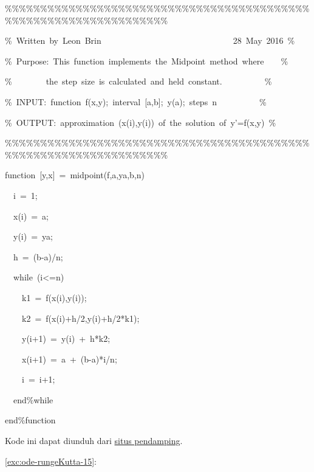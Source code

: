 \begin{lyxcode}
\%\%\%\%\%\%\%\%\%\%\%\%\%\%\%\%\%\%\%\%\%\%\%\%\%\%\%\%\%\%\%\%\%\%\%\%\%\%\%\%\%\%\%\%\%\%\%\%\%\%\%\%\%\%\%\%\%\%\%\%\%\%\%\%\%\%

\%~Written~by~Leon~Brin~~~~~~~~~~~~~~~~~~~~~~~~~~~~~~~28~May~2016~\%

\%~Purpose:~This~function~implements~the~Midpoint~method~where~~~~\%

\%~~~~~~~~the~step~size~is~calculated~and~held~constant.~~~~~~~~~~\%

\%~INPUT:~function~f(x,y);~interval~{[}a,b{]};~y(a);~steps~n~~~~~~~~~~\%

\%~OUTPUT:~approximation~(x(i),y(i))~of~the~solution~of~y'=f(x,y)~\%

\%\%\%\%\%\%\%\%\%\%\%\%\%\%\%\%\%\%\%\%\%\%\%\%\%\%\%\%\%\%\%\%\%\%\%\%\%\%\%\%\%\%\%\%\%\%\%\%\%\%\%\%\%\%\%\%\%\%\%\%\%\%\%\%\%\%

function~{[}y,x{]}~=~midpoint(f,a,ya,b,n)

~~i~=~1;

~~x(i)~=~a;

~~y(i)~=~ya;

~~h~=~(b-a)/n;

~~while~(i<=n)

~~~~k1~=~f(x(i),y(i));

~~~~k2~=~f(x(i)+h/2,y(i)+h/2{*}k1);

~~~~y(i+1)~=~y(i)~+~h{*}k2;

~~~~x(i+1)~=~a~+~(b-a){*}i/n;

~~~~i~=~i+1;

~~end\%while

end\%function~

\textrm{Kode ini dapat diunduh dari \href{http://lqbrin.github.io/tea-time-numerical/ancillaries.html}{situs pendamping}.}
\end{lyxcode}
\begin{description}
\item [{\ref{exc:ode-rungeKutta-15}:}] $\ $
\end{description}
